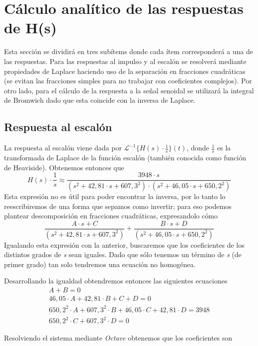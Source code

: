 \documentclass[11pt,a4paper]{report}
\begin{document}
\section*{Cálculo analítico de las respuestas de H(s)}

Esta sección se dividirá en tres subítems donde cada ítem corresponderá a una de las respuestas. Para las respuestas al impulso y al escalón se resolverá mediante propiedades de Laplace haciendo uso de la separación en fracciones cuadráticas (se evitan las fracciones simples para no trabajar con coeficientes complejos). Por otro lado, para el cálculo de la respuesta a la señal senoidal se utilizará la integral de Bromwich dado que esta coincide con la inversa de Laplace.

\subsection*{Respuesta al escalón}
    
La respuesta al escalón viene dada por $\mathcal{L}^{-1}\{H(s) \cdot \frac{1}{s}\}(t)$, donde $\frac{1}{s}$ es la transformada de Laplace de la función escalón (también conocida como función de Heaviside). Obtenemos entonces que
\[H(s) \cdot \frac{1}{s} \approx \frac{3948 \cdot s}{(s^2+42,81 \cdot s + 607,3^2)
\cdot (s^2+46,05 \cdot s + 650,2^2)}\]
Esta expresión no es útil para poder encontrar la inversa, por lo tanto lo reescribiremos de una forma que sepamos como invertir; para eso podemos plantear descomposición en fracciones cuadráticas, expresandolo cómo
\[\frac{A \cdot s + C}{(s^2+42,81 \cdot s + 607,3^2)} + \frac{B \cdot s + D}{(s^2+46,05 \cdot s + 650,2^2)}\]
Igualando esta expresión con la anterior, buscaremos que los coeficientes de los distintos grados de \textit{s} sean iguales. Dado que sólo tenemos un término de \textit{s} (de primer grado) tan solo tendremos una ecuación no homogénea.

\bigskip
Desarrollando la igualdad obtendremos entonces las siguientes ecuaciones
\begin{align*}
A+B=0 \\
46,05 \cdot A +42,81 \cdot B + C + D = 0 \\
650,2^2 \cdot A + 607,3^2 \cdot B + 46,05 \cdot C + 42,81 \cdot D = 3948 \\
650,2^2 \cdot C + 607,3^2 \cdot D = 0
\end{align*}

Resolviendo el sistema mediante \textit{Octave} obtenemos que los coeficientes son
\end{document}
